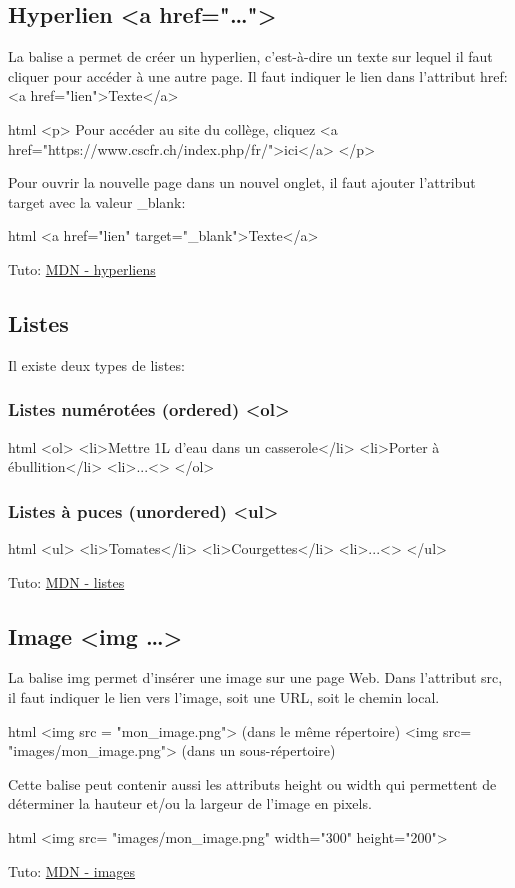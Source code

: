 \documentclass[a4paper,11pt]{article}
\begin{document}
\subsection{Hyperlien <a href="\dots">}
La balise a permet de créer un  hyperlien, c'est-à-dire un texte sur lequel il faut cliquer pour accéder à une autre page. Il faut indiquer le lien dans l'attribut href:
<a href="lien">Texte</a>
\begin{code}{html}
<p>
  Pour accéder au site du collège,
  cliquez <a href="https://www.cscfr.ch/index.php/fr/">ici</a>
</p>
\end{code}
Pour ouvrir la nouvelle page dans un nouvel onglet, il faut ajouter l'attribut target avec la valeur \_blank:
\begin{code}{html}
<a href="lien" target="_blank">Texte</a>
\end{code}
Tuto: \href{https://developer.mozilla.org/fr/docs/Web/HTML/Element/a}{MDN - hyperliens}

\subsection{Listes}
Il existe deux types de listes:
\subsubsection{Listes numérotées (ordered) <ol>}
\begin{code}{html}
<ol>
  <li>Mettre 1L d'eau dans un casserole</li>
  <li>Porter à ébullition</li>
  <li>...<\li>
</ol>
\end{code}

\subsubsection{Listes à puces (unordered) <ul>}
\begin{code}{html}
<ul>
  <li>Tomates</li>
  <li>Courgettes</li>
  <li>...<\li>
</ul>
\end{code}
Tuto: \href{https://developer.mozilla.org/fr/docs/Web/HTML/Element/li}{MDN - listes}

\subsection{Image <img \dots>}
La balise img permet d'insérer une image sur une page Web. Dans l'attribut src, il faut indiquer le lien vers l'image, soit une URL, soit le chemin local.
\begin{code}{html}
<img src = "mon_image.png"> (dans le même répertoire)
<img src= "images/mon_image.png"> (dans un sous-répertoire)
\end{code}
Cette balise peut contenir aussi les attributs height ou width qui permettent de déterminer la hauteur et/ou la largeur de l'image en pixels.
\begin{code}{html}
<img src= "images/mon_image.png" width="300" height="200">
\end{code}
Tuto: \href{https://developer.mozilla.org/fr/docs/Learn/HTML/Multimedia_and_embedding/Images_in_HTML}{MDN - images}
\end{document}
